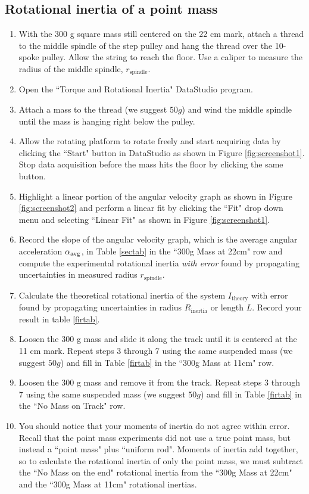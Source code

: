 \subsection{Rotational inertia of a point mass}
\label{pointmass}
\begin{enumerate}
	\item With the 300 g square mass still centered on the 22 cm mark, attach a thread to the middle spindle of the step pulley and hang the thread over the 10-spoke pulley.  Allow the string to reach the floor.  Use a caliper to measure the radius of the middle spindle, $r_\text{spindle}$.
	\item Open the ``Torque and Rotational Inertia" DataStudio program.
	\item Attach a mass to the thread (we suggest $50g$) and wind the middle spindle until the mass is hanging right below the pulley.
	\item Allow the rotating platform to rotate freely and start acquiring data by clicking the ``Start" button in DataStudio as shown in Figure \ref{fig:screenshot1}. Stop data acquisition before the mass hits the floor by clicking the same button.
	\item Highlight a linear portion of the angular velocity graph as shown in Figure \ref{fig:screenshot2} and perform a linear fit by clicking the ``Fit" drop down menu and selecting ``Linear Fit" as shown in Figure \ref{fig:screenshot1}.
	\item Record the slope of the angular velocity graph, which is the average angular acceleration $\alpha _{\rm avg}$, in Table \ref{sectab} in the ``300g Mass at 22cm" row and compute the experimental rotational inertia {\it{with error}} found by propagating uncertainties in measured radius $r_\text{spindle}$.
\item Calculate the theoretical rotational inertia of the system $I_\text{theory}$ with error found by propagating uncertainties in radius $R_\text{inertia}$ or length $L$. Record your result in table \ref{firtab}.
	\item Loosen the 300 g mass and slide it along the track until it is centered at the 11 cm mark.  Repeat steps 3 through 7 using the same suspended mass (we suggest $50g$) and fill in Table \ref{firtab} in the ``300g Mass at 11cm" row.
	\item Loosen the 300 g mass and remove it from the track.  Repeat steps 3 through 7 using the same suspended mass (we suggest $50g$) and fill in Table \ref{firtab} in the ``No Mass on Track" row.
\item You should notice that your moments of inertia do not agree within error. Recall that the point mass experiments did not use a true point mass, but instead a ``point mass" plus ``uniform rod". Moments of inertia add together, so to calculate the rotational inertia of only the point mass, we must subtract the ``No Mass on the end" rotational inertia from the ``300g Mass at 22cm" and the ``300g Mass at 11cm" rotational inertias.

\end{enumerate}
